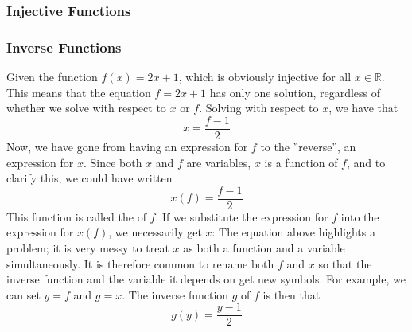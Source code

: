 \subsubsection{Injective Functions}
\subsubsection{Inverse Functions}
Given the function $ f(x)=2x+1 $, which is obviously injective for all $ x\in \mathbb{R} $. This means that the equation $ f=2x+1 $ has only one solution, regardless of whether we solve with respect to $ x $ or $ f $. Solving with respect to $ x $, we have that
\[ x=\frac{f-1}{2} \]
Now, we have gone from having an expression for $ f $ to the ''reverse'', an expression for $ x $. Since both $ x $ and $ f $ are variables, $ x $ is a function of $ f $, and to clarify this, we could have written
\[ x(f)=\frac{f-1}{2} \]
This function is called the  of $ f $. If we substitute the expression for $ f $ into the expression for $ x(f) $, we necessarily get $ x $:
The equation above highlights a problem; it is very messy to treat $ x $ as both a function and a variable simultaneously. It is therefore common to rename both $ f $ and $ x $ so that the inverse function and the variable it depends on get new symbols. For example, we can set $ y=f$ and $ g=x $. The inverse function $ g $ of $ f $ is then that
\[ g(y)=\frac{y-1}{2} \]

